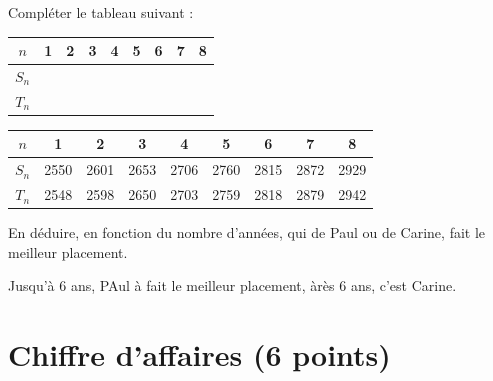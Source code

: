\documentclass[a4paper,11pt]{exam}
\begin{document}
\begin{questions}
	\question[1] Compléter le tableau suivant :
	
	\begin{center}
		
		\begin{tabular}{|@{$\quad $}c@{$\quad $}| @{$\qquad $}c@{$\qquad $} | @{$\qquad $}c@{$\qquad $} | @{$\qquad $}c@{$\qquad $} | @{$\qquad $}c@{$\qquad $} |@{$\qquad $}c@{$\qquad $} |@{$\qquad $}c@{$\qquad $} |@{$\qquad $}c@{$\qquad $}|@{$\qquad $}c@{$\qquad $}|}
			\hline
			$n$                           & 1 & 2 & 3 & 4 & 5 & 6 & 7 & 8 \\ \hline
			$S_n$ &   &   &   &   &   &   &   &   \\ \hline
			$T_n$ &   &   &   &   &   &   &   &   \\ \hline
		\end{tabular}
	\end{center}

	\begin{solution}
		\begin{small}
			
		\begin{center}
			
			\begin{tabular}{|@{$\quad $}c@{$\quad $}| @{\ }c@{\ } | @{\ }c@{\ } | @{\ }c@{\ } | @{\ }c@{\ } |@{\ }c@{\ } |@{\ }c@{\ } |@{\ }c@{\ }|@{\ }c@{\ }|}
				\hline
				$n$                           & 1 & 2 & 3 & 4 & 5 & 6 & 7 & 8 \\ \hline
				$S_n$ & 2550  & 2601  & 2653  & 2706  & 2760  & 2815  & 2872  & 2929  \\ \hline
				$T_n$ &  2548 &  2598 &  2650 &  2703 &  2759 &  2818 &  2879 &  2942 \\ \hline
			\end{tabular}
		\end{center}
		\end{small}
	\end{solution}
	
	\question[1] En déduire, en fonction du nombre d'années, qui de Paul ou de Carine, fait le meilleur placement.
	\begin{solution}
		Jusqu'à 6 ans, PAul à fait le meilleur placement, àrès 6 ans, c'est Carine.
	\end{solution}
	
\end{questions}

\section{Chiffre d'affaires (6 points)}
\end{document}
